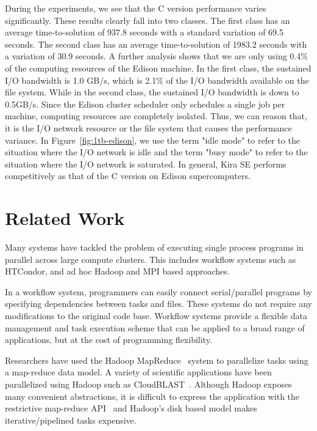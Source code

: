 \documentclass[conference]{IEEEtran}
\begin{document}
During the experiments, we see that the C version performance varies significantly. These results
clearly fall into two classes. The first class has an average time-to-solution of 937.8 seconds
with a standard variation of 69.5 seconds. The second class has an average time-to-solution 
of 1983.2 seconds with a variation of 30.9 seconds. A further analysis shows that we are only 
using 0.4\% of the computing resources of the Edison machine. In the first class, the sustained
I/O bandwidth is 1.0 GB/s, which is 2.1\% of the I/O bandwidth available on the file system.
While in the second class, the sustained I/O bandwidth is down to 0.5GB/s.
Since the Edison cluster scheduler only schedules a single job per machine, computing resources 
are completely isolated. Thus, we can reason that, it is the I/O network resource or the file system 
that causes the performance variance. In Figure~\ref{fig:1tb-edison}, we use the term "idle mode" to refer to the 
situation where the I/O network is idle and the term "busy mode" to refer to the situation where the
I/O network is saturated. In general, Kira SE performs competitively as that of the C version
on Edison supercomputers. 


\section{Related Work}
\label{sec:Related}

Many systems have tackled the problem of executing single process programs in parallel
across large compute clusters. This includes workflow systems such as HTCondor,
and ad hoc Hadoop and MPI based approaches.

In a workflow system, programmers can easily connect serial/parallel programs by specifying
dependencies between tasks and files. These systems do not require any modifications to
the original code base. Workflow systems provide a flexible data management and task execution
scheme that can be applied to a broad range of applications, but at the cost of programming
flexibility.

Researchers have used the Hadoop MapReduce~\cite{HADOOP} system to parallelize
tasks using a map-reduce data model. A variety of scientific applications have been parallelized
using Hadoop such as CloudBLAST~\cite{matsunaga08}. 
Although Hadoop exposes many convenient abstractions, it is difficult to express the application 
with the restrictive map-reduce API~\cite{dewitt08} and Hadoop's disk based model makes 
iterative/pipelined tasks expensive.
\end{document}
